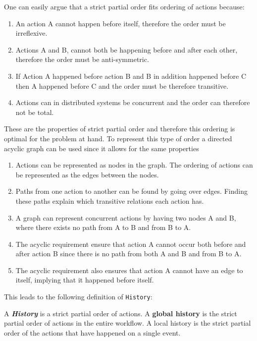 	\newpar One can easily argue that a strict partial order fits ordering of actions because:
	\begin{enumerate}
		\item An action A cannot happen before itself, therefore the order must be irreflexive.
		\item Actions A and B, cannot both be happening before and after each other, therefore the order must be anti-symmetric.
		\item If Action A happened before action B and B in addition happened before C then A happened before C and the order must be therefore transitive.
		\item Actions can in distributed systems be concurrent and the order can therefore not be total.
	\end{enumerate}
	\newpar These are the properties of strict partial order and therefore this ordering is optimal for the problem at hand. To represent this type of order a directed acyclic graph can be used since it allows for the same properties
	\begin{enumerate}
		\item Actions can be represented as nodes in the graph. The ordering of actions can be represented as the edges between the nodes.
		\item Paths from one action to another can be found by going over edges. Finding these paths explain which transitive relations each action has.
		\item A graph can represent concurrent actions by having two nodes A and B, where there exists no path from A to B and from B to A.
		\item The acyclic requirement ensure that action A cannot occur both before and after action B since there is no path from both A and B and from B to A.
		\item The acyclic requirement also ensures that action A cannot have an edge to itself, implying that it happened before itself.
	\end{enumerate}
	
	\newpar This leads to the following definition of \texttt{History}:
	
	\begin{definition}
		A \textit{\textbf{History}} is a strict partial order of actions. A \textbf{global history} is the strict partial order of actions in the entire workflow. A local history is the strict partial order of the actions that have happened on a single event. 
	\end{definition}
	
